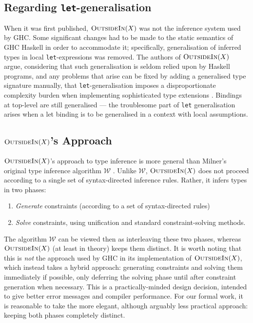 \documentclass[a4paper]{jfp}
\newcommand{\outsidein}{\textsc{OutsideIn}(X)}
\begin{document}
\subsection{Regarding {\tt let}-generalisation}

When it was first published, $\outsidein$ was not the inference system used by GHC\@. Some significant changes had to be made to the static semantics of GHC Haskell in order to accommodate it; specifically, generalisation of inferred types in local {\tt let}-expressions was removed. The authors of $\outsidein$ argue, considering that such generalisation is seldom relied upon by Haskell programs, and any problems that arise can be fixed by adding a generalised type signature manually, that {\tt let}-generalisation imposes a disproportionate complexity burden when implementing sophisticated type extensions \cite{Vytiniotis:2010ja}. Bindings at top-level are still generalised --- the troublesome part of {\tt let} generalisation arises when a let binding is to be generalised in a context with local assumptions. 

\subsection{$\outsidein$'s Approach}

$\outsidein$'s approach to type inference is more general than Milner's original type inference algorithm $\mathcal{W}$ \cite{Milner78atheory}. Unlike $\mathcal{W}$, $\outsidein$ does not proceed according to a single set of syntax-directed inference rules. Rather, it infers types in two phases:

\begin{enumerate}
\item \emph{Generate} constraints (according to a set of syntax-directed rules)
\item \emph{Solve} constraints, using unification and standard constraint-solving methods.	
\end{enumerate} 

The algorithm $\mathcal{W}$ can be viewed then as interleaving these two phases, whereas $\outsidein$ (at least in theory) keeps them distinct. It is worth noting that this is \emph{not} the approach used by GHC in its implementation of $\outsidein$, which instead takes a hybrid approach: generating constraints and solving them immediately if possible, only deferring the solving phase until after constraint generation when necessary. This is a practically-minded design decision, intended to give better error messages and compiler performance. For our formal work, it is reasonable to take the more elegant, although arguably less practical approach: keeping both phases completely distinct.
\end{document}
